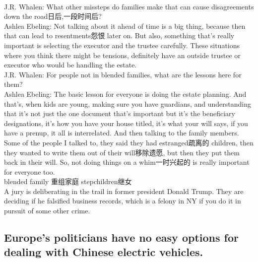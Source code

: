 \documentclass[a4paper,12pt]{article}
\begin{document}
\\J.R. Whalen: What other missteps do families make that can cause disagreements down the road日后,一段时间后?
\\Ashlea Ebeling: Not talking about it ahead of time is a big thing, because then that can lead to resentments怨恨 later on. But also, something that's really important is selecting the executor and the trustee carefully. These situations where you think there might be tensions, definitely have an outside trustee or executor who would be handling the estate.
\\J.R. Whalen: For people not in blended families, what are the lessons here for them?
\\Ashlea Ebeling: The basic lesson for everyone is doing the estate planning. And that's, when kids are young, making sure you have guardians, and understanding that it's not just the one document that's important but it's the beneficiary designations, it's how you have your house titled, it's what your will says, if you have a prenup, it all is interrelated. And then talking to the family members. Some of the people I talked to, they said they had estranged疏离的 children, then they wanted to write them out of their will移除遗愿, but then they put them back in their will. So, not doing things on a whim一时兴起的 is really important for everyone too.
\\blended family 重组家庭 stepchildren继女
\\A jury is deliberating in the trail in former president Donald Trump. They are deciding if he falsified business records, which is a felony in NY if you do it in pursuit of some other crime. 

\subsection{Europe's politicians have no easy options for dealing with Chinese electric vehicles.}
\end{document}

